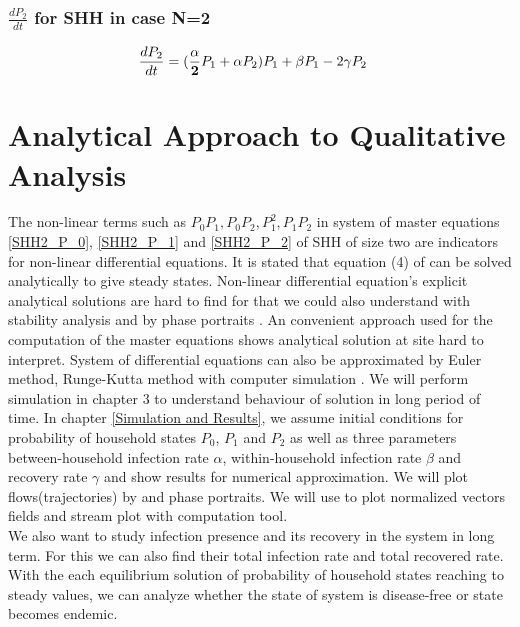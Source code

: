 \documentclass[paper=a4, fontsize=11pt, twoside, BCOR=12mm, parskip=full, listof=totoc]{scrreprt}
\begin{document}
\subsubsection*{$\frac{dP_2}{dt}$ for SHH in case N=2}
\begin{equation}
\label{SHH2_P_2}
	\begin{aligned}
		{\frac{dP_2}{dt}} & = (\frac{\alpha}{\bf{2}} P_1+{\alpha} P_2) P_{1} + \beta  P_{1} - 2 \gamma P_{2}
	\end{aligned}
\end{equation} 
\pagebreak
\section{ Analytical Approach to Qualitative Analysis } 

The non-linear terms such as $ P_0 P_1, P_0 P_2, P_1^2, P_1 P_2 $ in system of master equations \ref{SHH2_P_0}, \ref{SHH2_P_1} and \ref{SHH2_P_2} of SHH of size two are indicators for non-linear differential equations. It is stated that equation (4) of \cite{holmes2022approximating} can be solved analytically to give steady states. Non-linear differential equation's explicit analytical solutions are hard to find for that we could also understand with stability analysis and by phase portraits \cite{morgan2015linearization}. An convenient approach used for the computation \cite{docsagemath} of the master equations shows analytical solution at site \cite{cellsage} hard to interpret. System of differential equations can also be approximated by Euler method, Runge-Kutta method with computer simulation \cite{Mishraetal}. We will perform simulation in chapter 3 to understand behaviour of solution in long period of time. In chapter \ref{Simulation and Results}, we assume initial conditions for probability of household states $ P_0 $, $ P_1 $ and $ P_2 $ as well as three parameters between-household infection rate $\alpha$, within-household infection rate $\beta$ and recovery rate $\gamma$ and show results for numerical approximation. We will plot flows(trajectories) by \cite{solveivp} and phase portraits. We will use \cite{vectorfieldplot} to plot normalized vectors fields and stream plot \cite{streamlineplot} with computation tool.\\

We also want to study infection presence and its recovery in the system in long term. For this we can also find their total infection rate and total recovered rate. With the each equilibrium solution of probability of household states reaching to steady values, we can analyze whether the state of system is disease-free or state becomes endemic.\\ 
\end{document}
